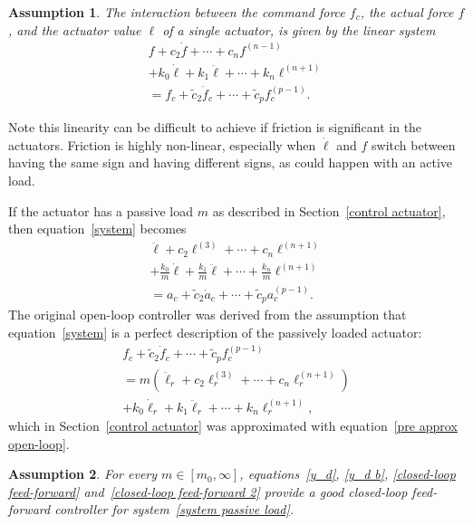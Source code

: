 \documentclass[reqno,twocolumn]{amsart}
\newtheorem{assumption}{Assumption}
\begin{document}
\begin{assumption}
\label{assume linear}
The interaction between the command force $f_c$, the actual force $f$, and the actuator value $\ell$ of a single actuator, is given by the linear system
\begin{multline}
\label{system}
f + c_2 \dot f + \cdots + c_n f^{(n-1)} \\
+ k_0 \dot \ell + k_1 \ddot \ell + \cdots + k_n \ell^{(n+1)} \\
= f_c + \tilde c_2 \dot f_c + \cdots + \tilde c_p f_c^{(p-1)}.
\end{multline}
\end{assumption}

Note this linearity can be difficult to achieve if friction is significant in the actuators.  Friction is highly non-linear, especially when $\dot \ell$ and $f$ switch between having the same sign and having different signs, as could happen with an active load.

If the actuator has a passive load $m$ as described in Section~\ref{control actuator}, then equation~\eqref{system} becomes
\begin{multline}
\label{system passive load}
\ddot \ell + c_2 \ell^{(3)} + \cdots + c_n \ell^{(n+1)} \\
+ \tfrac{k_0}m \dot \ell + \tfrac{k_1}m \ddot \ell + \cdots + \tfrac{k_n}m \ell^{(n+1)} \\
= a_c + \tilde c_2 \dot a_c + \cdots + \tilde c_p a_c^{(p-1)}.
\end{multline}
The original open-loop controller was derived from the assumption that equation~\eqref{system} is a perfect description of the passively loaded actuator:
\begin{multline}
f_c + \tilde c_2 \dot f_c + \cdots + \tilde c_p f_c^{(p-1)} \\
= m(\ddot \ell_r + c_2 \ell_r^{(3)} + \cdots + c_n \ell_r^{(n+1)}) \\
+ k_0 \dot \ell_r + k_1 \ddot \ell_r + \cdots + k_n \ell_r^{(n+1)} ,
\end{multline}
which in Section~\ref{control actuator} was approximated with equation~\eqref{pre approx open-loop}.

\begin{assumption}
\label{assume closed-loop feed-forward}
For every $m \in [m_0, \infty]$, equations~\eqref{y_d}, \eqref{y_d b}, \eqref{closed-loop feed-forward} and~\eqref{closed-loop feed-forward 2} provide a good closed-loop feed-forward controller for system~\eqref{system passive load}.
\end{assumption}
\end{document}
